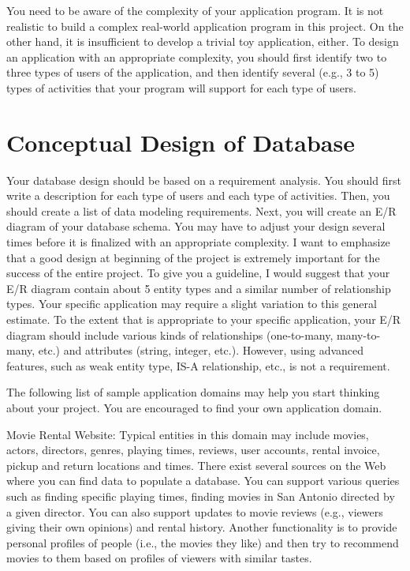 \documentclass[11pt]{article}
\begin{document}
  You need to be aware of the complexity of your application program. It
  is not realistic to build a complex real-world application program in
  this project. On the other hand, it is insufficient to develop a
  trivial toy application, either. To design an application with an
  appropriate complexity, you should first identify two to three types
  of users of the application, and then identify several (e.g., 3 to 5)
  types of activities that your program will support for each type of
  users.
\section*{Conceptual Design of Database}
\label{sec-3}


  Your database design should be based on a requirement analysis. You
  should first write a description for each type of users and each type
  of activities. Then, you should create a list of data modeling
  requirements. Next, you will create an E/R diagram of your database
  schema. You may have to adjust your design several times before it is
  finalized with an appropriate complexity. I want to emphasize that a
  good design at beginning of the project is extremely important for the
  success of the entire project. To give you a guideline, I would
  suggest that your E/R diagram contain about 5 entity types and a
  similar number of relationship types. Your specific application may
  require a slight variation to this general estimate. To the extent
  that is appropriate to your specific application, your E/R diagram
  should include various kinds of relationships (one-to-many,
  many-to-many, etc.) and attributes (string, integer, etc.). However,
  using advanced features, such as weak entity type, IS-A relationship,
  etc., is not a requirement.


  The following list of sample application domains may help you start
  thinking about your project. You are encouraged to find your own
  application domain.

  Movie Rental Website: Typical entities in this domain may include
  movies, actors, directors, genres, playing times, reviews, user
  accounts, rental invoice, pickup and return locations and times. There
  exist several sources on the Web where you can find data to populate a
  database. You can support various queries such as finding specific
  playing times, finding movies in San Antonio directed by a given
  director. You can also support updates to movie reviews (e.g., viewers
  giving their own opinions) and rental history. Another functionality
  is to provide personal profiles of people (i.e., the movies they like)
  and then try to recommend movies to them based on profiles of viewers
  with similar tastes.
\end{document}
